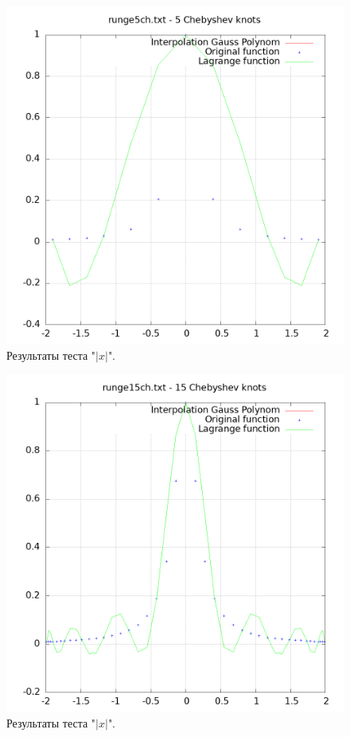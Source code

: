 \documentclass[14pt,a4paper]{extarticle}
\newcommand{\1}{\mathbbm{1}}
\begin{document}
    \begin{figure}
        \centering
        \includegraphics[scale=0.5]{Images/runge5ch.txt.png}
        \caption{Результаты теста "$|x|$".}
    \end{figure}
    \begin{figure}
        \centering
        \includegraphics[scale=0.5]{Images/runge15ch.txt.png}
        \caption{Результаты теста "$|x|$".}
    \end{figure}
\end{document}
